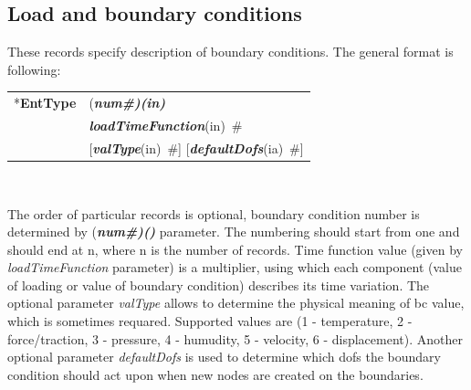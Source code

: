 \documentclass[a4paper]{article}
\makeatletter
\newcommand{\param}[1]{{\em #1}}
\newcommand{\fieldVal}[2]{\mbox{({\it\bf{#1}\#)\tiny (#2)}}}
\newcommand{\keywordnotype}[1]{\mbox{{\it{\bf{#1}}}}}
\newcommand{\keyword}[2]{\mbox{{\keywordnotype{#1}\tiny (#2)}}}
\newcommand{\entKeyword}[1]{\mbox{{*{\bf{#1}}}}}
\newcommand{\field}[2]{\mbox{\keyword{#1}{#2}~\#}}
\newcommand{\optField}[2]{\mbox{[\field{#1}{#2}]}}
\newenvironment{record}[1][]{\begin{tabular}{|ll}}{\end{tabular}\\}
\newcommand{\recentry}[2]{{#1}&{#2}\\}
\newcounter{rcc}
\newenvironment{record}[1][\textwidth]{\setcounter{rcc}{0}\begin{tabular*}{#1}{|ll@{\extracolsep{\fill}}r}}{\end{tabular*}\\}
\newcommand{\recentry}[2]{\ifthenelse{\value{rcc}>0}{&$\backslash$ \\}{\setcounter{rcc}{1}}{#1}&{#2}}
\makeatother
\begin{document}
\subsection{Load and boundary conditions}
\label{_LoadBoundaryInitialConditions}
These records specify description of  boundary conditions. The general format is
following:

\noindent
\begin{record}
  \recentry{\entKeyword{EntType}}{\fieldVal{num}{in}}
  \recentry{}{\field{loadTimeFunction}{in}}
  \recentry{}{\optField{valType}{in} \optField{defaultDofs}{ia}}
\end{record}

The order of particular  records is optional, boundary condition number is determined by \fieldVal{num}{} parameter.
The numbering should start from one and should end at n, where n is the number of records.
Time function value (given by \param{loadTimeFunction} parameter) is a multiplier, using which
each  component (value of loading or value of boundary condition)
describes its time variation.
The optional parameter \param{valType} allows to determine the
physical meaning of bc value, which is sometimes requared. Supported
values are (1 - temperature, 2 - force/traction,
3 - pressure, 4 - humudity, 5 - velocity, 6 - displacement).
Another optional parameter \param{defaultDofs} is used to determine which dofs the boundary condition should act
upon when new nodes are created on the boundaries.
\end{document}
